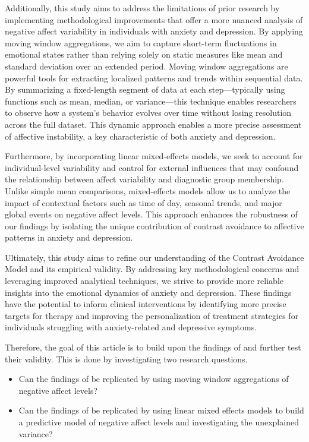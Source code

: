 Additionally, this study aims to address the limitations of prior research by implementing methodological improvements that offer a more nuanced analysis of negative affect variability in individuals with anxiety and depression. By applying moving window aggregations, we aim to capture short-term fluctuations in emotional states rather than relying solely on static measures like mean and standard deviation over an extended period. Moving window aggregations are powerful tools for extracting localized patterns and trends within sequential data. By summarizing a fixed-length segment of data at each step—typically using functions such as mean, median, or variance—this technique enables researchers to observe how a system's behavior evolves over time without losing resolution across the full dataset. This dynamic approach enables a more precise assessment of affective instability, a key characteristic of both anxiety and depression.  

Furthermore, by incorporating linear mixed-effects models, we seek to account for individual-level variability and control for external influences that may confound the relationship between affect variability and diagnostic group membership. Unlike simple mean comparisons, mixed-effects models allow us to analyze the impact of contextual factors such as time of day, seasonal trends, and major global events on negative affect levels. This approach enhances the robustness of our findings by isolating the unique contribution of contrast avoidance to affective patterns in anxiety and depression.  

Ultimately, this study aims to refine our understanding of the Contrast Avoidance Model and its empirical validity. By addressing key methodological concerns and leveraging improved analytical techniques, we strive to provide more reliable insights into the emotional dynamics of anxiety and depression. These findings have the potential to inform clinical interventions by identifying more precise targets for therapy and improving the personalization of treatment strategies for individuals struggling with anxiety-related and depressive symptoms.

Therefore, the goal of this article is to build upon the findings of \citeauthor{rutter2024} and further test their validity. This is done by investigating two research questions. 

\begin{itemize}
    \item Can the findings of \citeauthor{rutter2024} be replicated by using moving window aggregations of negative affect levels?
    \item Can the findings of \citeauthor{rutter2024} be replicated by using linear mixed effects models to build a predictive model of negative affect levels and investigating the unexplained variance?
\end{itemize}




